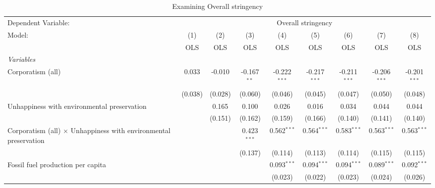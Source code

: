 
\begin{table}[htbp]
   \caption{Examining Overall stringency}
   \centering
   \begin{tabular}{lcccccccc}
      \toprule
      Dependent Variable: & \multicolumn{8}{c}{Overall stringency}\\
      Model:                                                                  & (1)     & (2)     & (3)           & (4)            & (5)            & (6)            & (7)            & (8)\\  
                                                                              &  OLS    & OLS     & OLS           & OLS            & OLS            & OLS            & OLS            & OLS\\  
      \midrule
      \emph{Variables}\\
      Corporatism (all)                                                       & 0.033   & -0.010  & -0.167$^{**}$ & -0.222$^{***}$ & -0.217$^{***}$ & -0.211$^{***}$ & -0.206$^{***}$ & -0.201$^{***}$\\   
                                                                              & (0.038) & (0.028) & (0.060)       & (0.046)        & (0.045)        & (0.047)        & (0.050)        & (0.048)\\   
      Unhappiness with environmental preservation                             &         & 0.165   & 0.100         & 0.026          & 0.016          & 0.034          & 0.044          & 0.044\\   
                                                                              &         & (0.151) & (0.162)       & (0.159)        & (0.166)        & (0.140)        & (0.141)        & (0.140)\\   
      Corporatism (all) $\times$ Unhappiness with environmental preservation  &         &         & 0.423$^{***}$ & 0.562$^{***}$  & 0.564$^{***}$  & 0.583$^{***}$  & 0.563$^{***}$  & 0.563$^{***}$\\   
                                                                              &         &         & (0.137)       & (0.114)        & (0.113)        & (0.114)        & (0.115)        & (0.115)\\   
      Fossil fuel production per capita                                       &         &         &               & 0.093$^{***}$  & 0.094$^{***}$  & 0.094$^{***}$  & 0.089$^{***}$  & 0.092$^{***}$\\   
                                                                              &         &         &               & (0.023)        & (0.022)        & (0.023)        & (0.024)        & (0.026)\\   

\end{tabular}
\end{table}
